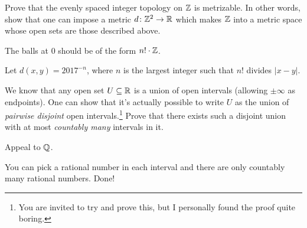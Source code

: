 \begin{problem}
	\onechili
	Prove that the evenly spaced integer topology on $\mathbb Z$ is metrizable.
	In other words, show that one can impose a metric $d \colon \mathbb Z^2 \to \mathbb R$
	which makes $\mathbb Z$ into a metric space whose open sets are those described above.
	\begin{hint}
		The balls at $0$ should be of the form $n! \cdot \mathbb Z$.
	\end{hint}
	\begin{sol}
		Let $d(x,y) = 2017^{-n}$, where $n$ is the largest integer
		such that $n!$ divides $\left\lvert x-y \right\rvert$.
	\end{sol}
\end{problem}


\begin{problem}
	\onechili
	We know that any open set $U \subseteq \mathbb R$
	is a union of open intervals (allowing $\pm\infty$ as endpoints).
	One can show that it's actually possible to write $U$ as the
	union of \emph{pairwise disjoint} open intervals.\footnote{You are invited to try
	and prove this, but I personally found the proof quite boring.}
	Prove that there exists such a disjoint union with at most \emph{countably many}
	intervals in it.
	\begin{hint}
		Appeal to $\mathbb Q$.
	\end{hint}
	\begin{sol}
		You can pick a rational number in each interval and
		there are only countably many rational numbers. Done!
	\end{sol}
\end{problem}
